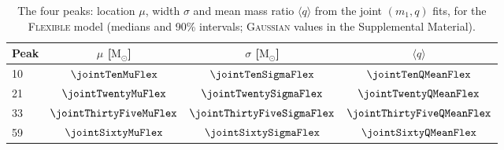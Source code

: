 \documentclass[%
 reprint,
 amsmath,amssymb,
 aps,
 prl,
 nofootinbib,nobibnotes,
 floatfix,
]{revtex4-2}
\newcommand{\Msun}{\ensuremath{\mathrm{M}_{\odot}}}
\newcommand{\flexiblespins}{\textsc{Flexible}\xspace}
\newcommand{\gaussianspins}{\textsc{Gaussian}\xspace}
\newcommand{\featTen}{10\xspace}
\newcommand{\featTwenty}{21\xspace}
\newcommand{\featThirtyFive}{33\xspace}
\newcommand{\featSixty}{59\xspace}
\begin{document}
\begin{table}
    \caption{The four peaks: location $\mu$, width $\sigma$ and mean mass ratio $\langle q \rangle$ from the joint $(m_1, q)$ fits, for the \flexiblespins model (medians and 90\% intervals; \gaussianspins values in the Supplemental Material).}
    \label{tab: peaks}
    \begin{ruledtabular}
    \begin{tabular}{lccc}
        Peak & $\mu$ [\Msun] & $\sigma$ [\Msun] & $\langle q \rangle$ \\
        \hline
        \featTen & $\jointTenMuFlex$ & $\jointTenSigmaFlex$ & $\jointTenQMeanFlex$ \\
        \featTwenty & $\jointTwentyMuFlex$ & $\jointTwentySigmaFlex$ & $\jointTwentyQMeanFlex$ \\
        \featThirtyFive & $\jointThirtyFiveMuFlex$ & $\jointThirtyFiveSigmaFlex$ & $\jointThirtyFiveQMeanFlex$ \\
        \featSixty & $\jointSixtyMuFlex$ & $\jointSixtySigmaFlex$ & $\jointSixtyQMeanFlex$ \\
    \end{tabular}
    \end{ruledtabular}
\end{table}
\end{document}
